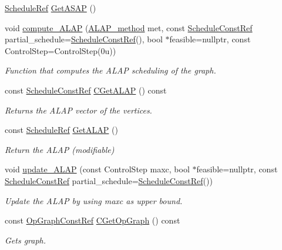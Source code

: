 \begin{DoxyCompactItemize}
\hyperlink{schedule_8hpp_af67f402958b3b52a1ec5cc4ce08ae3b9}{Schedule\+Ref} \hyperlink{classASLAP_ac0629687f10668f95901bc157bdd7d49}{Get\+A\+S\+AP} ()
\item 
void \hyperlink{classASLAP_a5668d3b6ee0112bd3881444a684c8c2f}{compute\+\_\+\+A\+L\+AP} (\hyperlink{classASLAP_a091a7ef2aa403de3cabf4275cd1eb211}{A\+L\+A\+P\+\_\+method} met, const \hyperlink{schedule_8hpp_a85e4dea8a1611026193d8ca13fc5a260}{Schedule\+Const\+Ref} partial\+\_\+schedule=\hyperlink{schedule_8hpp_a85e4dea8a1611026193d8ca13fc5a260}{Schedule\+Const\+Ref}(), bool $\ast$feasible=nullptr, const Control\+Step=Control\+Step(0u))
\begin{DoxyCompactList}\small\item\em Function that computes the A\+L\+AP scheduling of the graph. \end{DoxyCompactList}\item 
const \hyperlink{schedule_8hpp_a85e4dea8a1611026193d8ca13fc5a260}{Schedule\+Const\+Ref} \hyperlink{classASLAP_a294d0c4ba3226198f1a4b25881ab7653}{C\+Get\+A\+L\+AP} () const
\begin{DoxyCompactList}\small\item\em Returns the A\+L\+AP vector of the vertices. \end{DoxyCompactList}\item 
const \hyperlink{schedule_8hpp_af67f402958b3b52a1ec5cc4ce08ae3b9}{Schedule\+Ref} \hyperlink{classASLAP_aaaa8fac60ae1b268a8bb7de6f2b83032}{Get\+A\+L\+AP} ()
\begin{DoxyCompactList}\small\item\em Return the A\+L\+AP (modifiable) \end{DoxyCompactList}\item 
void \hyperlink{classASLAP_af2b9d79b6200a5a8d53b9480cd87125e}{update\+\_\+\+A\+L\+AP} (const Control\+Step maxc, bool $\ast$feasible=nullptr, const \hyperlink{schedule_8hpp_a85e4dea8a1611026193d8ca13fc5a260}{Schedule\+Const\+Ref} partial\+\_\+schedule=\hyperlink{schedule_8hpp_a85e4dea8a1611026193d8ca13fc5a260}{Schedule\+Const\+Ref}())
\begin{DoxyCompactList}\small\item\em Update the A\+L\+AP by using maxc as upper bound. \end{DoxyCompactList}\item 
const \hyperlink{op__graph_8hpp_a9a0b240622c47584bee6951a6f5de746}{Op\+Graph\+Const\+Ref} \hyperlink{classASLAP_a382d6ce5ff99ca079e692a3fcfbff5e9}{C\+Get\+Op\+Graph} () const
\begin{DoxyCompactList}\small\item\em Gets graph. \end{DoxyCompactList}\end{DoxyCompactItemize}
